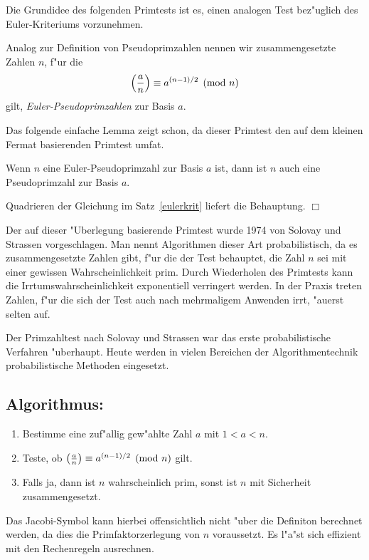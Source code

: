 Die Grundidee des folgenden Primtests ist es, einen analogen Test
bez"uglich des Euler-Kriteriums vorzunehmen.

\begin{definition}
  Analog zur Definition von Pseudoprimzahlen nennen wir
  zusammengesetzte Zahlen $n$, f"ur die
  $$ \left(\frac{a}{n}\right) \equiv a^{(n-1)/2} \pmod{n} $$ gilt, {\em
  Euler-Pseudoprimzahlen} zur Basis $a$.
\end{definition}

Das folgende einfache Lemma zeigt schon, da\3 dieser Primtest den auf
dem kleinen Fermat basierenden Primtest umfa\3t.

\begin{lemma}
  Wenn $n$ eine Euler-Pseudoprimzahl zur Basis $a$ ist, dann ist $n$
  auch eine Pseudoprimzahl zur Basis $a$.
\end{lemma}

\beweis 
Quadrieren der Gleichung im Satz~\ref{eulerkrit} liefert die
Behauptung. \hfill $\Box$

Der auf dieser "Uberlegung basierende Primtest wurde 1974 von Solovay
und Strassen vorgeschlagen. Man nennt Algorithmen dieser Art
probabilistisch, da es zusammengesetzte Zahlen gibt, f"ur die der Test
behauptet, die Zahl $n$ sei mit einer gewissen Wahrscheinlichkeit
prim. Durch Wiederholen des Primtests kann die
Irrtumswahrscheinlichkeit exponentiell verringert werden. In der
Praxis treten Zahlen, f"ur die sich der Test auch nach mehrmaligem
Anwenden irrt, "au\3erst selten auf.

Der Primzahltest nach Solovay und Strassen war das erste
probabilistische Verfahren "uberhaupt. Heute werden in vielen
Bereichen der Algorithmentechnik probabilistische Methoden eingesetzt.

\subsection*{Algorithmus:}
  \begin{enumerate}
    \item Bestimme eine zuf"allig gew"ahlte Zahl $a$ mit $1 < a < n$.
    \item Teste, ob $\left(\frac{a}{n}\right) \equiv a^{(n-1)/2} \pmod{n}$ gilt.
    \item Falls ja, dann ist $n$ wahrscheinlich prim, sonst ist $n$
          mit Sicherheit zusammengesetzt.
  \end{enumerate}

Das Jacobi-Symbol kann hierbei offensichtlich nicht "uber die
Definiton berechnet werden, da dies die Primfaktorzerlegung von $n$
voraussetzt. Es l"a"st sich effizient mit den Rechenregeln ausrechnen.

